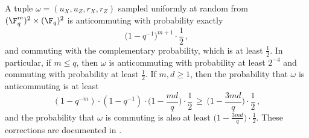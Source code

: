 \begin{lemma}
	\label{fact:omega-anticomm-prob}
	\leanok
	A tuple $\omega = (u_X,u_Z,r_X,r_Z)$ sampled uniformly at random from
	$(\F_q^m)^2 \times (\F_q)^2$ is anticommuting with probability exactly
	\[
		\big(1 - q^{-1}\big)^{m+1} \cdot \frac{1}{2}\,,
	\]
	and commuting with the complementary probability, which is at least
	$\frac12$. In particular, if $m \leq q$, then $\omega$ is anticommuting
	with probability at least $2^{-4}$ and commuting with probability at
	least $\frac12$. If $m, d \geq 1$, then the probability that $\omega$ is
	anticommuting is at least
	\[
		(1 - q^{-m}) \cdot (1 - q^{-1}) \cdot \Big(1 - \frac{md}{q}\Big) \cdot \frac{1}{2}
		\,\geq\, \Big(1 - \frac{3md}{q}\Big) \cdot \frac{1}{2}\,,
	\]
	and the probability that $\omega$ is commuting is also at least
	$\big(1 - \frac{3md}{q}\big) \cdot \frac{1}{2}$.  These corrections are
	documented in \cite{gap:qpbt_anticommuting-probability}.
\end{lemma}
